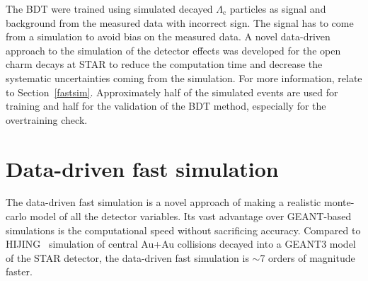 The BDT were trained using simulated decayed $\Lambda_\mathrm{c}$ particles as signal and background from the measured data with incorrect sign. The signal has to come from a simulation to avoid bias on the measured data. A novel data-driven approach to the simulation of the detector effects was developed for the open charm decays at STAR to reduce the computation time and decrease the systematic uncertainties coming from the simulation. For more information, relate to Section~\ref{fastsim}\@. Approximately half of the simulated events are used for training and half for the validation of the BDT method, especially for the overtraining check.




\section{Data-driven fast simulation\label{fastsim}}

The data-driven fast simulation is a novel approach of making a realistic monte-carlo model of all the detector variables. Its vast advantage over GEANT-based~\cite{GEANT} simulations is the computational speed without sacrificing accuracy. Compared to HIJING~\cite{HIJING} simulation of central Au+Au collisions decayed into a GEANT3 model of the STAR detector, the data-driven fast simulation is $\sim$7 orders of magnitude faster.

